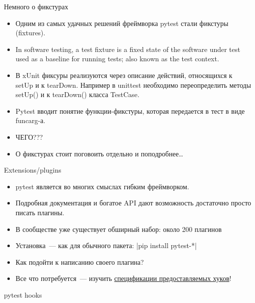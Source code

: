 \documentclass{beamer}
\begin{document}
\begin{frame}[fragile]{Немного о фикстурах}
    \begin{itemize}
    \item Одним из самых удачных решений фреймворка pytest стали фикстуры (fixtures).
    \pause \item In software testing, a test fixture is a fixed state of the software
    under test used as a baseline for running tests; also known as the test context.
    \pause \item В xUnit фиксуры реализуются через описание действий, относящихся к setUp и к tearDown.
    Например в unittest необходимо переопределить методы setUp() и к tearDown() класса TestCase.
    \pause \item Pytest вводит понятие функции-фикстуры, которая передается в тест в виде funcarg-а.
    \pause \item ЧЕГО???
    \pause \item О фикстурах стоит поговоить отдельно и поподробнее\ldots
    \end{itemize}
\end{frame}

\begin{frame}[fragile]{Extensions/plugins}
    \begin{itemize}
    \item pytest является во многих смыслах гибким фреймворком.
    \pause \item Подробная документация и богатое API дают возможность достаточно просто писать плагины.
    \pause \item В сообществе уже существует обширный набор: около 200 плагинов
    \pause \item Установка~--- как для обычного пакета: |pip install pytest-*|
    \pause \item Как подойти к написанию своего плагина?
    \pause \item Все что потребуется~--- изучить \href{http://pytest.org/latest/writing_plugins.html\#pytest-hook-reference}{спецификации предоставляемых хуков}!
    \end{itemize}
\end{frame}

\begin{frame}[fragile]{pytest hooks}
\end{frame}
\end{document}
